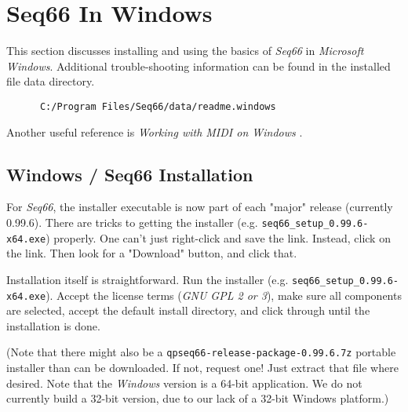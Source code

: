 %
%
%

\section{Seq66 In Windows}
\label{sec:windows}

   This section discusses installing and using the basics of \textsl{Seq66}
   in \textsl{Microsoft Windows}.  Additional trouble-shooting information can
   be found in the installed file data directory.

   \begin{verbatim}
      C:/Program Files/Seq66/data/readme.windows
   \end{verbatim}

   Another useful reference is
   \textsl{Working with MIDI on Windows}
   \cite{windowsmidi}.

\subsection{Windows / Seq66 Installation}
\label{subsec:windows_seq66_installation}

   For \textsl{Seq66}, the installer executable is now part of
   each "major" release (currently 0.99.6).
   There are tricks to getting the installer
   (e.g. \texttt{seq66\_setup\_0.99.6-x64.exe}) properly. 
   One can't just right-click and save the link.
   Instead, click on the link.  Then look for a "Download" button, and
   click that.

   Installation itself is straightforward.  Run the installer (e.g.
   \texttt{seq66\_setup\_0.99.6-x64.exe}).  Accept the license terms
   (\textsl{GNU GPL 2 or 3}),
   make sure all components are selected, accept the default
   install directory, and click through until the installation is done.

   (Note that there might also be a
   \texttt{qpseq66-release-package-0.99.6.7z} portable installer
   than can be downloaded.
   If not, request one!
   Just extract that file where desired.
   Note that the \textsl{Windows} version is a 64-bit
   application. We do not currently build a 32-bit version, due to
   our lack of a 32-bit Windows platform.)

